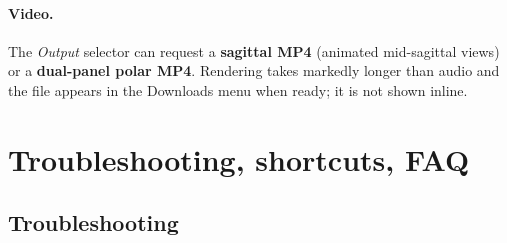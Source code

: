 \documentclass[11pt,a4paper]{article}
\begin{document}
\paragraph{Video.} The \emph{Output} selector can request a
\textbf{sagittal MP4} (animated mid-sagittal views) or a
\textbf{dual-panel polar MP4}. Rendering takes markedly longer than audio
and the file appears in the Downloads menu when ready; it is not shown
inline.

\section{Troubleshooting, shortcuts, FAQ}

\subsection{Troubleshooting}
\end{document}
